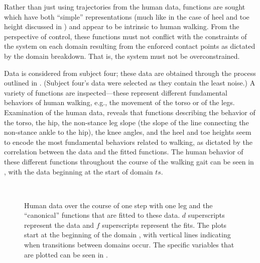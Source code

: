 Rather than just using trajectories from the human data, functions are sought
which have both ``simple'' representations (much like in the case of heel and
toe height discussed in ) and appear to be intrinsic
to human walking.
%
From the perspective of control, these functions must not conflict with the
constraints of the system on each domain resulting from the enforced contact
points as dictated by the domain breakdown.
%
That is, the system must not be overconstrained.

Data is considered from subject four; these data are obtained through the
process outlined in .
%
(Subject four's data were selected as they contain the least noise.)
%
A variety of functions are inspected---these represent different fundamental
behaviors of human walking, e.g., the movement of the torso or of the legs.
%
Examination of the human data, reveals that functions describing the behavior of
the torso, the hip, the non-stance leg slope (the slope of the line connecting
the non-stance ankle to the hip), the knee angles, and the heel and toe heights
seem to encode the most fundamental behaviors related to walking, as dictated by
the correlation between the data and the fitted functions.
%
The human behavior of these different functions throughout the course of the
walking gait can be seen in , with the data
beginning at the start of domain $ts$.

\begin{figure}[ht!]
  \centering
  \\
  \caption{Human data over the course of one step with one leg and the
    ``canonical'' functions that are fitted to these data.
    $d$ superscripts represent the data and $f$ superscripts represent the fits.
    The plots start at the beginning of the domain {\DA}, with vertical lines
    indicating when transitions between domains occur.
    The specific variables that are plotted can be seen in
    .}
  \label{fig:constraints-fitting}
\end{figure}

